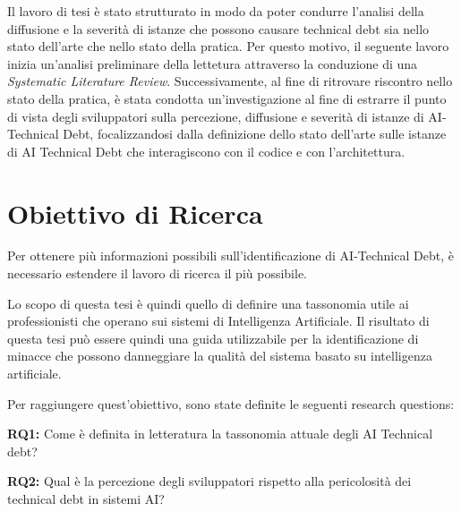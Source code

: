 Il lavoro di tesi è stato strutturato in modo da poter condurre l'analisi della diffusione e la severità di istanze che possono causare technical debt sia nello stato dell'arte che nello stato della pratica.
Per questo motivo, il seguente lavoro inizia un'analisi preliminare della lettetura attraverso la conduzione di una \textit{Systematic Literature Review}.
Successivamente, al fine di ritrovare riscontro nello stato della pratica, è stata condotta un'investigazione al fine di estrarre il punto di vista degli sviluppatori sulla percezione, diffusione e severità di istanze di AI-Technical Debt, focalizzandosi dalla definizione dello stato dell'arte sulle istanze di AI Technical Debt che interagiscono con il codice e con l'architettura.

\section{Obiettivo di Ricerca}
Per ottenere più informazioni possibili sull'identificazione di AI-Technical Debt, è necessario estendere il lavoro di ricerca il più possibile. 

Lo scopo di questa tesi è quindi quello di definire una tassonomia utile ai professionisti che operano sui sistemi di Intelligenza Artificiale. Il risultato di questa tesi può essere quindi una guida utilizzabile per la identificazione di minacce che possono danneggiare la qualità del sistema basato su intelligenza artificiale.

Per raggiungere quest'obiettivo, sono state definite le seguenti research questions:
\break
\begin{rqbox}
\textbf{RQ1:} Come è definita in letteratura la tassonomia attuale degli AI Technical debt?
\end{rqbox}

\begin{rqbox}
\textbf{RQ2:} Qual è la percezione degli sviluppatori rispetto alla pericolosità dei technical debt in sistemi AI?
\end{rqbox}


